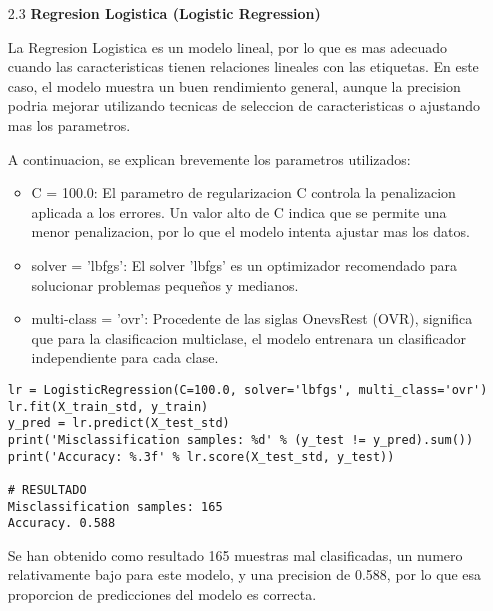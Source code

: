 \documentclass{article}
\begin{document}
\bigskip

\begin{itemize}

\item[2.3]  {\bf Regresion Logistica (Logistic Regression)}

La Regresion Logistica es un modelo lineal, por lo que es mas adecuado cuando las caracteristicas tienen relaciones lineales con las etiquetas. En este caso, el modelo muestra un buen rendimiento general, aunque la precision podria mejorar utilizando tecnicas de seleccion de caracteristicas o ajustando mas los parametros.

A continuacion, se explican brevemente los parametros utilizados:

\begin{itemize}

\item
C = 100.0: El parametro de regularizacion C controla la penalizacion aplicada a los errores. Un valor alto de C indica que se permite una menor penalizacion, por lo que el modelo intenta ajustar mas los datos.

\item
solver = 'lbfgs': El solver 'lbfgs' es un optimizador recomendado para solucionar problemas pequeños y medianos.

\item
multi-class = 'ovr': Procedente de las siglas OnevsRest (OVR), significa que para la
clasificacion multiclase, el modelo entrenara un clasificador independiente para cada 
clase.

\end{itemize}

\begin{tcolorbox}[width=14cm]
\begin{scriptsize}
\begin{verbatim}
lr = LogisticRegression(C=100.0, solver='lbfgs', multi_class='ovr')
lr.fit(X_train_std, y_train)
y_pred = lr.predict(X_test_std)
print('Misclassification samples: %d' % (y_test != y_pred).sum())
print('Accuracy: %.3f' % lr.score(X_test_std, y_test))

# RESULTADO
Misclassification samples: 165
Accuracy. 0.588
\end{verbatim}
\end{scriptsize}
\end{tcolorbox}

Se han obtenido como resultado 165 muestras mal clasificadas, un numero relativamente bajo para este modelo, y una precision de 0.588, por lo que esa proporcion de  predicciones del modelo es correcta.

\end{itemize}
\end{document}
